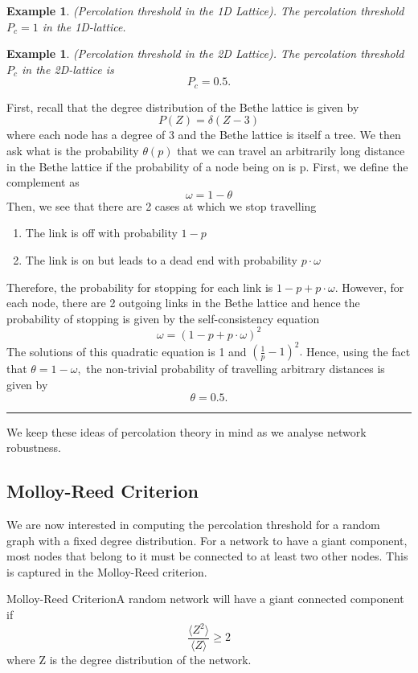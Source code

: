 \documentclass[twoside]{article}
\newtheorem{example}[theorem]{Example}
\newenvironment{proof}{{\bf Proof:}}{\hfill\rule{2mm}{2mm}}
\begin{document}
\begin{example}(Percolation threshold in the 1D Lattice). The percolation threshold $P_c = 1$ in the 1D-lattice.
\end{example}

\begin{example}(Percolation threshold in the 2D Lattice). The percolation threshold $P_c$ in the 2D-lattice is 
$$
P_c = 0.5.
$$
\end{example}

\begin{proof} First, recall that the degree distribution of the Bethe lattice is given by 
$$
P(Z) = \delta (Z - 3)
$$
where each node has a degree of 3 and the Bethe lattice is itself a tree. We then ask what is the probability $\theta(p)$ that we can travel an arbitrarily long distance in the Bethe lattice if the probability of a node being on is p. First, we define the complement as 
$$
\omega = 1 - \theta
$$
Then, we see that there are 2 cases at which we stop travelling 
\begin{enumerate}
\item The link is off with probability $1 - p$
\item The link is on but leads to a dead end with probability $p \cdot \omega$
\end{enumerate}
Therefore, the probability for stopping for each link is $1 - p + p\cdot \omega.$ However, for each node, there are 2 outgoing links in the Bethe lattice and hence the probability of stopping is given by the self-consistency equation 
$$
\omega = (1 - p + p\cdot \omega)^2
$$
The solutions of this quadratic equation is 1 and $(\frac{1}{p} - 1)^2.$ Hence, using the fact that $\theta = 1 - \omega,$ the non-trivial probability of travelling arbitrary distances is given by 
$$
\theta = 0.5.
$$
\end{proof}

We keep these ideas of percolation theory in mind as we analyse network robustness.

\subsection{Molloy-Reed Criterion}

We are now interested in computing the percolation threshold for a random graph with a fixed degree distribution. For a network to have a giant component, most nodes that belong to it must be connected to at least two other nodes. This is captured in the Molloy-Reed criterion.
\begin{definition_exam}{Molloy-Reed Criterion}{}A random network will have a giant connected component if 
$$
\frac{\langle Z^2 \rangle}{\langle Z \rangle} \geq 2
$$
where Z is the degree distribution of the network.
\end{definition_exam}
\end{document}
